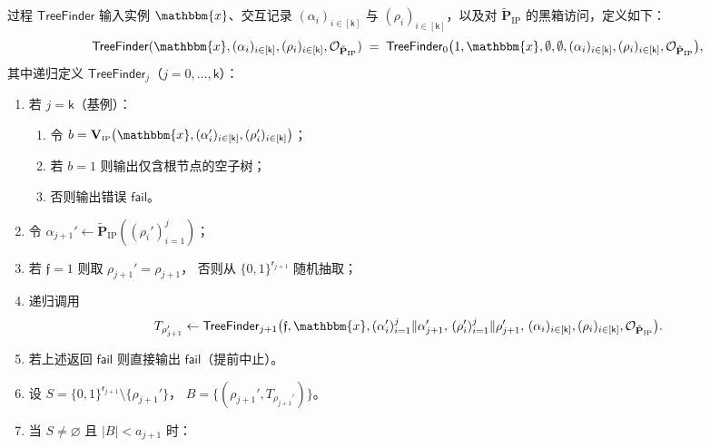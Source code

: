 \documentclass[american,singlepageview]{snargs-book-zh}
\newcommand{\Bits}{\{0,1\}}
\newcommand{\Malicious}[1]{\tilde{#1}}
\newcommand{\concat}{\|}
\newcommand{\BlackBox}[1]{\mathcal{O}_{#1}}
\newcommand{\DecisionBit}{b}
\newcommand{\Instance}{\mathbbm{x}}
\newcommand{\ProtoProver}{P}
\newcommand{\ProtoVerifier}{V}
\newcommand{\ProtoRoundComplexity}{\mathsf{k}}
\newcommand{\ProtoRandomnessComplexity}{\mathsf{r}}
\newcommand{\RoundIndex}{i}
\newcommand{\IPSubscript}{\scriptscriptstyle\mathrm{IP}}
\newcommand{\IPFormat}[1]{\mathbf{#1}}
\newcommand{\IPVerifier}{\IPFormat{\ProtoVerifier}_{\IPSubscript}}
\newcommand{\IPMaliciousProver}{\Malicious{\IPFormat{\ProtoProver}}_{\IPSubscript}}
\newcommand{\IPRoundComplexity}{\ProtoRoundComplexity}
\newcommand{\IPRandomnessComplexity}{\ProtoRandomnessComplexity}
\newcommand{\IPProverMessage}{\alpha}
\newcommand{\IPVerifierRandomMessage}{\rho}
\newcommand{\IPTuple}[1]{(#1_{\RoundIndex})_{\RoundIndex \in [\IPRoundComplexity]}}
\newcommand{\SSArity}{a}
\newcommand{\SSTree}{T}
\newcommand{\SSTreeFinder}{\mathsf{TreeFinder}}
\newcommand{\SSRemainingRandomness}{S}
\newcommand{\SSBranches}{B}
\newcommand{\SSLeftFlag}{\mathfrak{f}}
\newcommand{\SSFail}{\mathsf{fail}}
\newcommand{\SSPartialProverMessages}{(\IPProverMessage_{\RoundIndex}')_{\RoundIndex=1}^{j}}
\newcommand{\SSPartialVerifierMessages}{(\IPVerifierRandomMessage_{\RoundIndex}')_{\RoundIndex=1}^{j}}
\begin{document}
\begin{construction}
\label{construction:ss-tree-finder}
过程 $\SSTreeFinder$ 输入实例 $\Instance$、交互记录 $\IPTuple{\IPProverMessage}$ 与 $\IPTuple{\IPVerifierRandomMessage}$，以及对 $\IPMaliciousProver$ 的黑箱访问，定义如下：
\[
  \SSTreeFinder(\Instance,\IPTuple{\IPProverMessage},\IPTuple{\IPVerifierRandomMessage},\BlackBox{\IPMaliciousProver})
  \;=\;
  \SSTreeFinder_{0}\bigl(1,\Instance,\emptyset,\emptyset,\IPTuple{\IPProverMessage},\IPTuple{\IPVerifierRandomMessage},\BlackBox{\IPMaliciousProver}\bigr),
\]
其中递归定义 $\SSTreeFinder_{j}$（$j=0,\dots,\IPRoundComplexity$）：
\begin{enumerate}[nolistsep]
  \item 若 $j=\IPRoundComplexity$（基例）：
    \begin{enumerate}[nolistsep]
      \item 令
        $\DecisionBit=\IPVerifier\bigl(\Instance,\IPTuple{\IPProverMessage'},\IPTuple{\IPVerifierRandomMessage'}\bigr)$；
      \item 若 $\DecisionBit=1$ 则输出仅含根节点的空子树；
      \item 否则输出错误 $\SSFail$。
    \end{enumerate}
  \item 令
    $\IPProverMessage_{j+1}'\gets\IPMaliciousProver(\SSPartialVerifierMessages)$；
  \item 若 $\SSLeftFlag=1$ 则取
    $\IPVerifierRandomMessage_{j+1}'=\IPVerifierRandomMessage_{j+1}$，
    否则从 $\Bits^{\IPRandomnessComplexity_{j+1}}$ 随机抽取；
  \item 递归调用
    \[
      \SSTree_{\IPVerifierRandomMessage_{j+1}'}
      \gets
      \SSTreeFinder_{j+1}\bigl(\SSLeftFlag,\Instance,
      \SSPartialProverMessages\concat\IPProverMessage_{j+1}',\,
      \SSPartialVerifierMessages\concat\IPVerifierRandomMessage_{j+1}',\,
      \IPTuple{\IPProverMessage},\IPTuple{\IPVerifierRandomMessage},\BlackBox{\IPMaliciousProver}\bigr).
    \]
  \item 若上述返回 $\SSFail$ 则直接输出 $\SSFail$（提前中止）。
  \item 设
    $\SSRemainingRandomness=\Bits^{\IPRandomnessComplexity_{j+1}}\setminus\{\IPVerifierRandomMessage_{j+1}'\}$，
    $\SSBranches=\{(\IPVerifierRandomMessage_{j+1}',\SSTree_{\IPVerifierRandomMessage_{j+1}'})\}$。
  \item 当 $\SSRemainingRandomness\neq\varnothing$ 且 $|\SSBranches|<\SSArity_{j+1}$ 时：
    \begin{enumerate}[nolistsep]

\end{enumerate}
\end{enumerate}
\end{construction}
\end{document}
